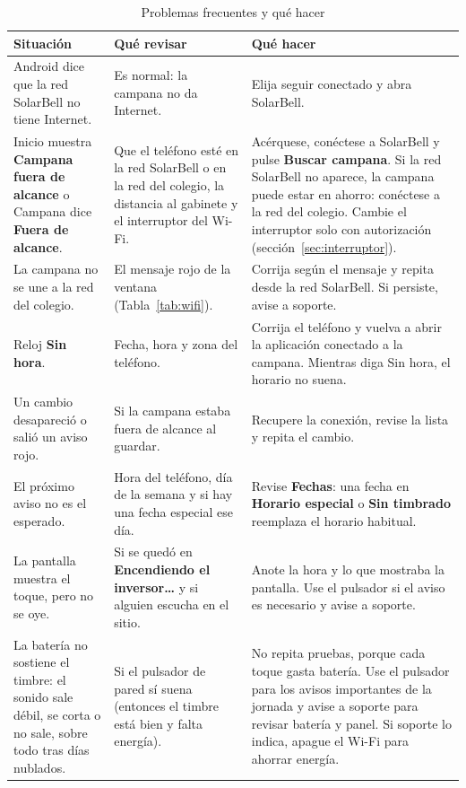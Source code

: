 \documentclass[a4paper,11pt]{article}
\newcommand{\boton}[1]{\textbf{#1}}
\begin{document}
\begin{table}[H]
\centering\small
\caption{Problemas frecuentes y qué hacer}
\begin{tabularx}{\linewidth}{@{}P{3.9cm}YY@{}}
\toprule
\textbf{Situación} & \textbf{Qué revisar} & \textbf{Qué hacer} \\
\midrule
Android dice que la red SolarBell no tiene Internet. & Es normal: la campana no da Internet. & Elija seguir conectado y abra SolarBell. \\
Inicio muestra \textbf{Campana fuera de alcance} o Campana dice \textbf{Fuera de alcance}. & Que el teléfono esté en la red SolarBell o en la red del colegio, la distancia al gabinete y el interruptor del Wi-Fi. & Acérquese, conéctese a SolarBell y pulse \boton{Buscar campana}. Si la red SolarBell no aparece, la campana puede estar en ahorro: conéctese a la red del colegio. Cambie el interruptor solo con autorización (sección~\ref{sec:interruptor}). \\
La campana no se une a la red del colegio. & El mensaje rojo de la ventana (Tabla~\ref{tab:wifi}). & Corrija según el mensaje y repita desde la red SolarBell. Si persiste, avise a soporte. \\
Reloj \textbf{Sin hora}. & Fecha, hora y zona del teléfono. & Corrija el teléfono y vuelva a abrir la aplicación conectado a la campana. Mientras diga Sin hora, el horario no suena. \\
Un cambio desapareció o salió un aviso rojo. & Si la campana estaba fuera de alcance al guardar. & Recupere la conexión, revise la lista y repita el cambio. \\
El próximo aviso no es el esperado. & Hora del teléfono, día de la semana y si hay una fecha especial ese día. & Revise \textbf{Fechas}: una fecha en \textbf{Horario especial} o \textbf{Sin timbrado} reemplaza el horario habitual. \\
La pantalla muestra el toque, pero no se oye. & Si se quedó en \textbf{Encendiendo el inversor…} y si alguien escucha en el sitio. & Anote la hora y lo que mostraba la pantalla. Use el pulsador si el aviso es necesario y avise a soporte. \\
La batería no sostiene el timbre: el sonido sale débil, se corta o no sale, sobre todo tras días nublados. & Si el pulsador de pared sí suena (entonces el timbre está bien y falta energía). & No repita pruebas, porque cada toque gasta batería. Use el pulsador para los avisos importantes de la jornada y avise a soporte para revisar batería y panel. Si soporte lo indica, apague el Wi-Fi para ahorrar energía. \\

\end{tabularx}
\end{table}
\end{document}
